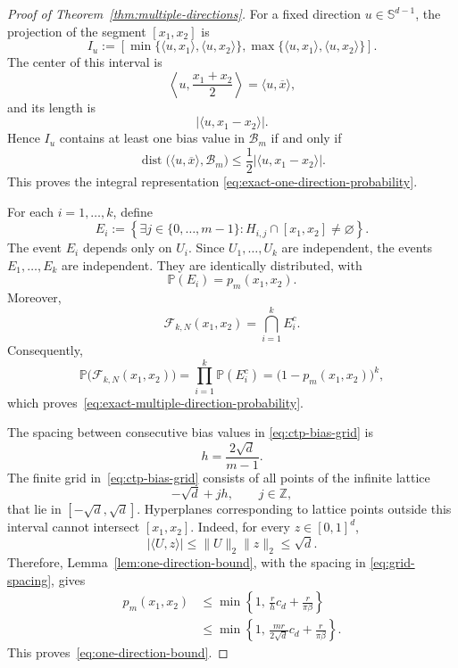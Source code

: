 \begin{proof}[Proof of Theorem~\ref{thm:multiple-directions}]
For a fixed direction $u\in\mathbb{S}^{d-1}$, the projection of the
segment $[x_1,x_2]$ is
\begin{equation}
    I_u
    :=
    \left[
        \min\{\langle u,x_1\rangle,\langle u,x_2\rangle\},
        \max\{\langle u,x_1\rangle,\langle u,x_2\rangle\}
    \right].
    \label{eq:projected-segment}
\end{equation}
The center of this interval is
\[
    \left\langle
        u,\frac{x_1+x_2}{2}
    \right\rangle
    =
    \langle u,\overline{x}\rangle,
\]
and its length is
\[
    |\langle u,x_1-x_2\rangle|.
\]
Hence $I_u$ contains at least one bias value in $\mathcal{B}_m$ if
and only if
\[
    \operatorname{dist}
    \bigl(
        \langle u,\overline{x}\rangle,
        \mathcal{B}_m
    \bigr)
    \leq
    \frac{1}{2}
    |\langle u,x_1-x_2\rangle|.
\]
This proves the integral representation
\eqref{eq:exact-one-direction-probability}.

For each $i=1,\ldots,k$, define
\begin{equation}
    E_i
    :=
    \left\{
        \exists j\in\{0,\ldots,m-1\}:
        H_{i,j}\cap[x_1,x_2]\neq\varnothing
    \right\}.
    \label{eq:direction-separation-event}
\end{equation}
The event $E_i$ depends only on $U_i$. Since
$U_1,\ldots,U_k$ are independent, the events
$E_1,\ldots,E_k$ are independent. They are identically distributed,
with
\[
    \mathbb{P}(E_i)=p_m(x_1,x_2).
\]
Moreover,
\[
    \mathcal{F}_{k,N}(x_1,x_2)
    =
    \bigcap_{i=1}^k E_i^c.
\]
Consequently,
\[
    \mathbb{P}\bigl(\mathcal{F}_{k,N}(x_1,x_2)\bigr)
    =
    \prod_{i=1}^k
    \mathbb{P}(E_i^c)
    =
    \bigl(1-p_m(x_1,x_2)\bigr)^k,
\]
which proves~\eqref{eq:exact-multiple-direction-probability}.

The spacing between consecutive bias values in
\eqref{eq:ctp-bias-grid} is
\begin{equation}
    h
    =
    \frac{2\sqrt{d}}{m-1}.
    \label{eq:grid-spacing}
\end{equation}
The finite grid in~\eqref{eq:ctp-bias-grid} consists of all points of
the infinite lattice
\[
    -\sqrt{d}+jh,
    \qquad
    j\in\mathbb{Z},
\]
that lie in $[-\sqrt{d},\sqrt{d}]$. Hyperplanes corresponding to
lattice points outside this interval cannot intersect $[x_1,x_2]$.
Indeed, for every $z\in[0,1]^d$,
\[
    |\langle U,z\rangle|
    \leq
    \|U\|_2\|z\|_2
    \leq
    \sqrt{d}.
\]
Therefore, Lemma~\ref{lem:one-direction-bound}, with the spacing in
\eqref{eq:grid-spacing}, gives
\begin{align}
    p_m(x_1,x_2)
    &\leq
    \min
    \left\{
        1,\,
        \frac{r}{h}c_d
        +
        \frac{r}{\pi\beta}
    \right\}
    \nonumber\\
    &\leq
    \min
    \left\{
        1,\,
        \frac{mr}{2\sqrt{d}}c_d
        +
        \frac{r}{\pi\beta}
    \right\}.
    \label{eq:one-direction-bound-proof}
\end{align}
This proves~\eqref{eq:one-direction-bound}.


\end{proof}

